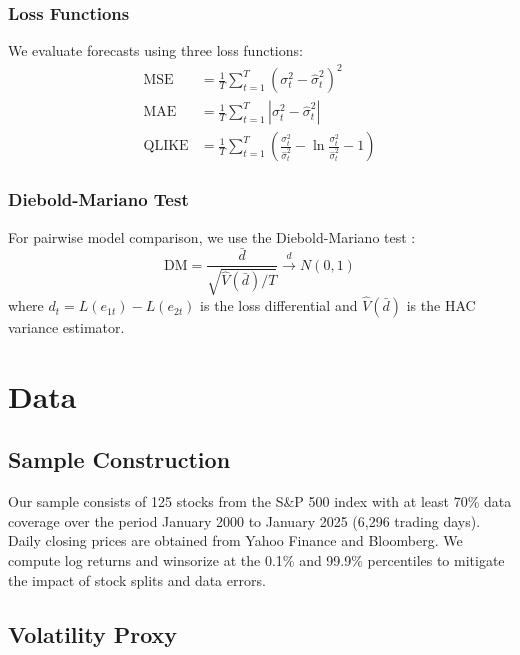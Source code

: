 \documentclass[12pt,a4paper]{article}
\newcommand{\MSE}{\text{MSE}}
\newcommand{\MAE}{\text{MAE}}
\newcommand{\QLIKE}{\text{QLIKE}}
\begin{document}
\subsubsection{Loss Functions}

We evaluate forecasts using three loss functions:
\begin{align}
    \MSE &= \frac{1}{T}\sum_{t=1}^T (\sigma_t^2 - \hat{\sigma}_t^2)^2 \\
    \MAE &= \frac{1}{T}\sum_{t=1}^T |\sigma_t^2 - \hat{\sigma}_t^2| \\
    \QLIKE &= \frac{1}{T}\sum_{t=1}^T \left(\frac{\sigma_t^2}{\hat{\sigma}_t^2} - \ln\frac{\sigma_t^2}{\hat{\sigma}_t^2} - 1\right)
\end{align}

\subsubsection{Diebold-Mariano Test}

For pairwise model comparison, we use the Diebold-Mariano test \citep{diebold1995comparing}:
\begin{equation}
    \text{DM} = \frac{\bar{d}}{\sqrt{\hat{V}(\bar{d})/T}} \xrightarrow{d} N(0,1)
\end{equation}
where $d_t = L(e_{1t}) - L(e_{2t})$ is the loss differential and $\hat{V}(\bar{d})$ is the HAC variance estimator.

\section{Data}
\label{sec:data}

\subsection{Sample Construction}

Our sample consists of 125 stocks from the S\&P 500 index with at least 70\% data coverage over the period January 2000 to January 2025 (6,296 trading days). Daily closing prices are obtained from Yahoo Finance and Bloomberg. We compute log returns and winsorize at the 0.1\% and 99.9\% percentiles to mitigate the impact of stock splits and data errors.

\subsection{Volatility Proxy}
\end{document}

